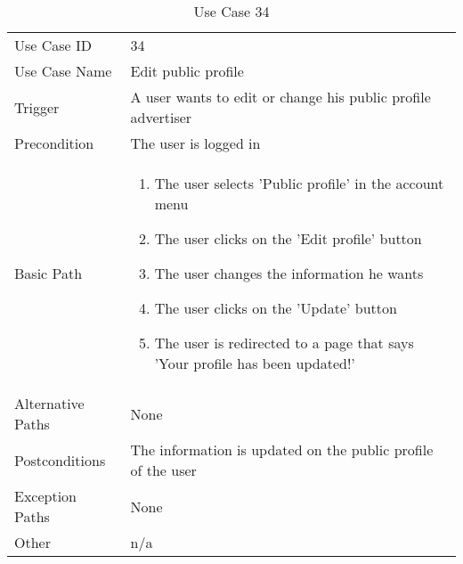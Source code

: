 \begin{table}[H]
\centering
\label{table-use-case-34}
\begin{tabular}{|p{3cm}|p{10cm}}
Use Case ID       & 34                                                           
\\
Use Case Name     & Edit public profile                                                        
\\
Trigger           & A user wants to edit or change his public profile
advertiser
\\
Precondition      & The user is logged in
\\
Basic Path        & \begin{enumerate}

\item The user selects 'Public profile' in the account menu
\item The user clicks on the 'Edit profile' button
\item The user changes the information he wants
\item The user clicks on the 'Update' button
\item The user is redirected to a page that says 'Your profile has been
updated!'
\end{enumerate} 
     \\
Alternative Paths & None                       
\\
Postconditions    & The information is updated on the public profile of the user
\\
Exception Paths   & None                          \\
Other             & n/a                                                                                                                                                                                                        
\end{tabular}
\caption{Use Case 34}
\end{table}